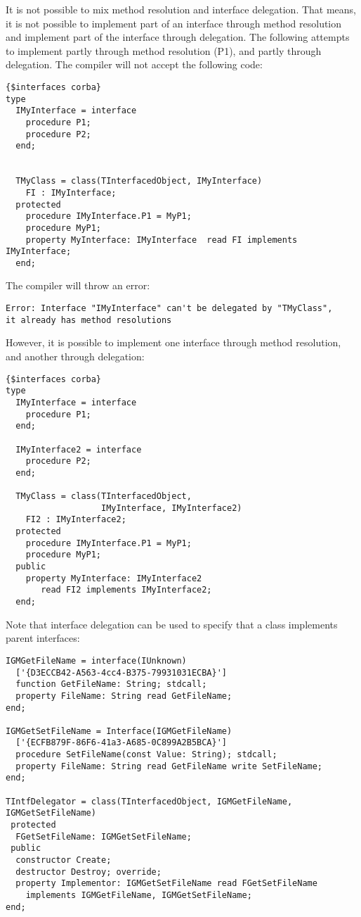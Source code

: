 It is not possible to mix method resolution and interface delegation.
That means, it is not possible to implement part of an interface through
method resolution and implement part of the interface through delegation.
The following attempts to implement  partly through method
resolution (P1), and partly through delegation. The compiler will not accept
the following code:
\begin{verbatim}
{$interfaces corba}
type
  IMyInterface = interface
    procedure P1;
    procedure P2;
  end;


  TMyClass = class(TInterfacedObject, IMyInterface)
    FI : IMyInterface;
  protected
    procedure IMyInterface.P1 = MyP1;
    procedure MyP1;
    property MyInterface: IMyInterface  read FI implements IMyInterface;
  end;
\end{verbatim}
The compiler will throw an error:
\begin{verbatim}
Error: Interface "IMyInterface" can't be delegated by "TMyClass",
it already has method resolutions
\end{verbatim}

However, it is possible to implement one interface through method
resolution, and another through delegation:
\begin{verbatim}
{$interfaces corba}
type
  IMyInterface = interface
    procedure P1;
  end;

  IMyInterface2 = interface
    procedure P2;
  end;

  TMyClass = class(TInterfacedObject,
                   IMyInterface, IMyInterface2)
    FI2 : IMyInterface2;
  protected
    procedure IMyInterface.P1 = MyP1;
    procedure MyP1;
  public
    property MyInterface: IMyInterface2
       read FI2 implements IMyInterface2;
  end;
\end{verbatim}

Note that interface delegation can be used to specify that a class
implements parent interfaces:
\begin{verbatim}
IGMGetFileName = interface(IUnknown)
  ['{D3ECCB42-A563-4cc4-B375-79931031ECBA}']
  function GetFileName: String; stdcall;
  property FileName: String read GetFileName;
end;

IGMGetSetFileName = Interface(IGMGetFileName)
  ['{ECFB879F-86F6-41a3-A685-0C899A2B5BCA}']
  procedure SetFileName(const Value: String); stdcall;
  property FileName: String read GetFileName write SetFileName;
end;

TIntfDelegator = class(TInterfacedObject, IGMGetFileName, IGMGetSetFileName)
 protected
  FGetSetFileName: IGMGetSetFileName;
 public
  constructor Create;
  destructor Destroy; override;
  property Implementor: IGMGetSetFileName read FGetSetFileName
    implements IGMGetFileName, IGMGetSetFileName;
end;
\end{verbatim}


